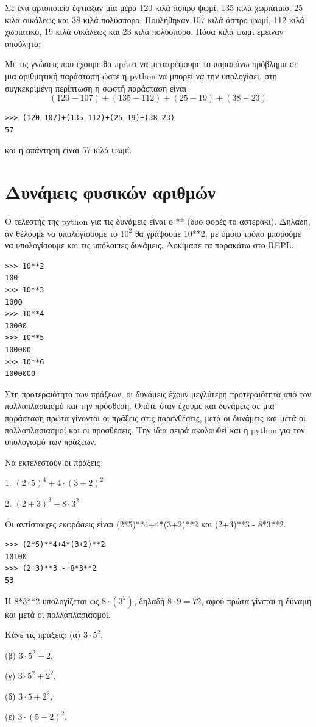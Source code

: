 \begin{exercise}
Σε ένα αρτοποιείο έφτιαξαν μία μέρα 120 κιλά άσπρο ψωμί, 135 κιλά χωριάτικο, 25 κιλά σικάλεως και 38 κιλά πολύσπορο. Πουλήθηκαν 107 κιλά άσπρο ψωμί, 112 κιλά χωριάτικο, 19 κιλά σικάλεως και 23 κιλά πολύσπορο. Πόσα κιλά ψωμί έμειναν απούλητα;
\end{exercise}
Με τις γνώσεις που έχουμε θα πρέπει να μετατρέψουμε το παραπάνω πρόβλημα σε μια αριθμητική παράσταση ώστε η python να μπορεί να την υπολογίσει, στη συγκεκριμένη περίπτωση η σωστή παράσταση είναι $$(120-107)+(135-112)+(25-19)+(38-23)$$
\begin{lstlisting}
>>> (120-107)+(135-112)+(25-19)+(38-23)
57
\end{lstlisting}
και η απάντηση είναι 57 κιλά ψωμί.

\section{Δυνάμεις φυσικών αριθμών}
Ο τελεστής της python για τις δυνάμεις είναι ο **  (δυο φορές το αστεράκι). Δηλαδή, αν θέλουμε να υπολογίσουμε το $10^2$ θα γράψουμε 10**2, με όμοιο τρόπο μπορούμε να υπολογίσουμε και τις υπόλοιπες δυνάμεις. Δοκίμασε τα παρακάτω στο REPL.
\begin{lstlisting}
>>> 10**2
100
>>> 10**3
1000
>>> 10**4
10000
>>> 10**5
100000
>>> 10**6
1000000
\end{lstlisting}
Στη προτεραιότητα των πράξεων, οι δυνάμεις έχουν μεγλύτερη προτεραιότητα από τον πολλαπλασιασμό και την πρόσθεση. Οπότε όταν έχουμε και δυνάμεις σε μια παράσταση πρώτα γίνονται οι πράξεις στις παρενθέσεις, μετά οι δυνάμεις και μετά οι πολλαπλασιασμοί και οι προσθέσεις. Την ίδια σειρά ακολουθεί και η python για τον υπολογισμό των πράξεων.
\begin{exercise}
Να εκτελεστούν οι πράξεις 

 1. $(2\cdot 5)^4+4\cdot (3+2)^2$

 2. $(2+3)^3 - 8\cdot 3^2$

\end{exercise}
Οι αντίστοιχες εκφράσεις είναι (2*5)**4+4*(3+2)**2 και (2+3)**3 - 8*3**2.

\begin{lstlisting}
>>> (2*5)**4+4*(3+2)**2
10100
>>> (2+3)**3 - 8*3**2
53
\end{lstlisting}
H 8*3**2 υπολογίζεται ως $8\cdot (3^2)$, δηλαδή $8\cdot 9 = 72$, αφού πρώτα γίνεται η δύναμη και μετά οι πολλαπλασιασμοί.

\begin{exercise}
Κάνε τις πράξεις: 
(α) $3\cdot 5^2$, 

(β) $3\cdot 5^2 + 2$, 

(γ) $3\cdot5^2 + 2^2$, 

(δ) $3\cdot 5 + 2^2$, 

(ε) $3\cdot(5 + 2)^2$.
\end{exercise}

